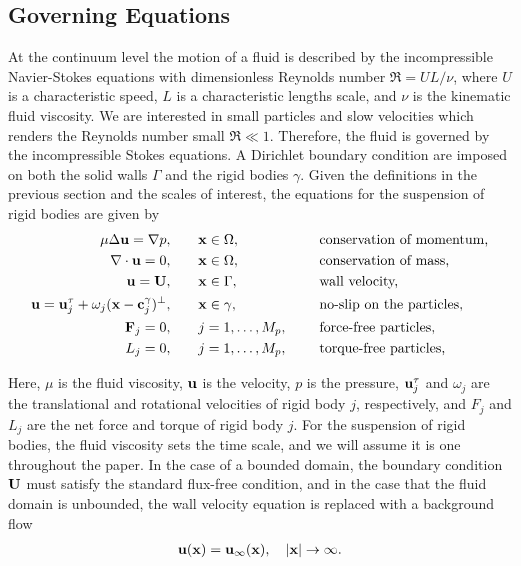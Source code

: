 \documentclass[preprint, 10pt]{elsarticle}
\begin{document}
\subsection{Governing Equations}\label{sec:governing}
At the continuum level the motion of a fluid is described by the
incompressible Navier-Stokes equations with dimensionless Reynolds
number $\Re = UL/\nu$, where $U$ is a characteristic speed, $L$ is a
characteristic lengths scale, and $\nu$ is the kinematic fluid
viscosity.  We are interested in small particles and slow velocities
which renders the Reynolds number small $\Re \ll 1$.  Therefore, the
fluid is governed by the incompressible Stokes equations.  A Dirichlet
boundary condition are imposed on both the solid walls $\Gamma$ and the
rigid bodies $\gamma$.  Given the definitions in the previous section
and the scales of interest, the equations for the suspension of rigid
bodies are given by
\begin{equation}
  \label{eqn:modelEquations}
  \begin{split}
  \mu \Delta {\mathbf{u}} = {\nabla} p, &\hspace{20pt} {\mathbf{x}} \in \Omega, \hspace*{.2in}
    &&\mbox{conservation of momentum,}\\
  {\nabla} \cdot {\mathbf{u}} = 0, &\hspace{20pt} {\mathbf{x}} \in \Omega, \hspace*{.2in}
    &&\mbox{conservation of mass,} \\
  {\mathbf{u}} = {\mathbf{U}}, &\hspace{20pt} {\mathbf{x}} \in \Gamma, \hspace*{.2in} 
    &&\mbox{wall velocity,} \\
  {\mathbf{u}} = {\mathbf{u}}^\tau_j + \omega_j({\mathbf{x}}-{\mathbf{c}}^\gamma_j)^\perp,&\hspace{20pt} 
    {\mathbf{x}} \in \gamma, \hspace*{.2in} &&\mbox{no-slip on the particles,} \\
  {\mathbf{F}}_j = 0, &\hspace{20pt}j=1,\ldots,M_p, \hspace*{.2in} 
    &&\mbox{force-free particles,} \\
  L_j = 0, &\hspace{20pt}j=1,\ldots,M_p, \hspace*{.2in} 
    &&\mbox{torque-free particles,}
  \end{split}
\end{equation}

Here, $\mu$ is the fluid viscosity, ${\mathbf{u}}$ is the velocity, $p$ is the
pressure, ${\mathbf{u}}^\tau_j$ and $\omega_j$ are the translational and
rotational velocities of rigid body $j$, respectively, and $F_j$ and
$L_j$ are the net force and torque of rigid body $j$.  For the
suspension of rigid bodies, the fluid viscosity sets the time scale, and
we will assume it is one throughout the paper.  In the case of a bounded
domain, the boundary condition ${\mathbf{U}}$ must satisfy the standard flux-free
condition, and in the case that the fluid domain is unbounded, the wall
velocity equation is replaced with a background flow
\begin{align*}
  {\mathbf{u}}({\mathbf{x}}) = {\mathbf{u}}_\infty({\mathbf{x}}), \quad |{\mathbf{x}}| \rightarrow \infty.
\end{align*}
\end{document}
